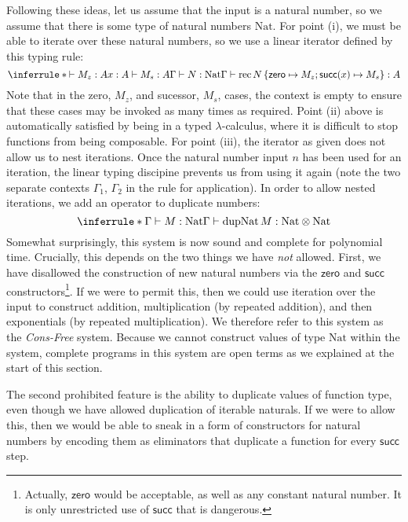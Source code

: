 \documentclass[acmsmall,screen]{acmart}
\newcommand{\tmRec}{\mathrm{rec}}
\newcommand{\tyNat}{\mathrm{Nat}}
\newcommand{\conZero}{\mathsf{zero}}
\newcommand{\conSucc}{\mathsf{succ}}
\newcommand{\dupNat}{\mathrm{dupNat}}
\begin{document}
Following these ideas, let us assume that the input is a natural
number, so we assume that there is some type of natural numbers
$\tyNat$. For point (i), we must be able to iterate over these natural
numbers, so we use a linear iterator defined by this typing rule:
\begin{displaymath}
  \inferrule*
  {\vdash M_z : A \\ x : A \vdash M_s : A \\ \Gamma \vdash N : \tyNat}
  {\Gamma \vdash \tmRec\,N\,\{\conZero \mapsto M_z; \conSucc(x) \mapsto M_s\} : A}
\end{displaymath}
Note that in the zero, $M_z$, and sucessor, $M_s$, cases, the context
is empty to ensure that these cases may be invoked as many times as
required. Point (ii) above is automatically satisfied by being in a
typed $\lambda$-calculus, where it is difficult to stop functions from
being composable. For point (iii), the iterator as given does not
allow us to nest iterations. Once the natural number input $n$ has
been used for an iteration, the linear typing discipine prevents us
from using it again (note the two separate contexts $\Gamma_1$,
$\Gamma_2$ in the rule for application). In order to allow nested
iterations, we add an operator to duplicate numbers:
\begin{displaymath}
  \inferrule*
  {\Gamma \vdash M : \tyNat}
  {\Gamma \vdash \dupNat\,M : \tyNat \otimes \tyNat}
\end{displaymath}
Somewhat surprisingly, this system is now sound and complete for
polynomial time. Crucially, this depends on the two things we have
\emph{not} allowed. First, we have disallowed the construction of new
natural numbers via the $\conZero$ and $\conSucc$
constructors\footnote{Actually, $\conZero$ would be acceptable, as
  well as any constant natural number. It is only unrestricted use of
  $\conSucc$ that is dangerous.}. If we were to permit this, then we
could use iteration over the input to construct addition,
multiplication (by repeated addition), and then exponentials (by
repeated multiplication). We therefore refer to this system as the
\emph{Cons-Free} system.  Because we cannot construct values of type
$\tyNat$ within the system, complete programs in this system are open
terms as we explained at the start of this section.

The second prohibited feature is the ability to duplicate values of
function type, even though we have allowed duplication of iterable
naturals. If we were to allow this, then we would be able to sneak in
a form of constructors for natural numbers by encoding them as
eliminators that duplicate a function for every $\conSucc$ step.
\end{document}
